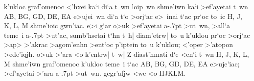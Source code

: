 \begin{Parallel}{}{}
{{k'ukloc graf'omenoc <'hxei ka`i di`a t~wn loip~wn shme'iwn
ka`i >ef'ayetai t~wn 
AB, BG, GD, DE, EA e>ujei~wn di`a t`o >orj`ac e>~inai
t`ac pr`oc to~ic H, J, K, L, M shme'ioic gwn'iac. e>i g`ar o>uk
>ef'ayetai a\kern -.7pt >ut~wn, >all`a teme~i a\kern -.7pt >ut'ac, sumb'hsetai t`hn t~h|
diam'etrw| to~u k'uklou pr`oc >orj`ac >ap> >'akrac >agom'enhn
>ent`oc p'iptein to~u k'uklou; <'oper >'atopon >ede'iqjh.
o>uk >'ara <o k'entrw| t~w| Z diast'hmati d`e <en`i t~wn
H, J, K, L, M shme'iwn graf'omenoc k'ukloc teme~i t`ac AB, BG, GD, DE,
EA e>uje'iac;  >ef'ayetai >'ara a\kern -.7pt >ut~wn. gegr'afjw <wc <o HJKLM.}\\~\\~\\

\epsfysize=2.2in
\centerline{}

}

\end{Parallel}
